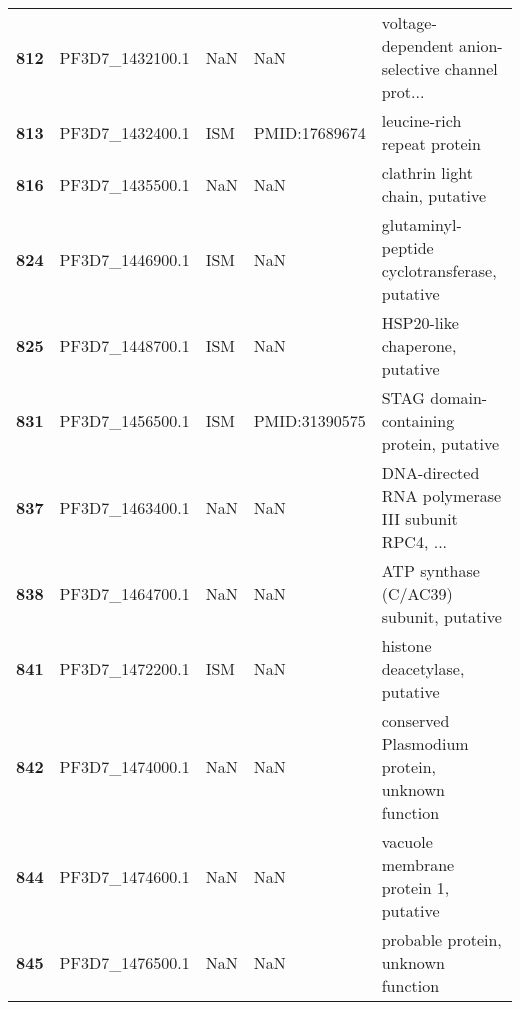 \begin{longtable}{lllll}
\textbf{812} &  PF3D7\_1432100.1 &      NaN &            NaN &  voltage-dependent anion-selective channel prot... \\
\textbf{813} &  PF3D7\_1432400.1 &      ISM &  PMID:17689674 &                        leucine-rich repeat protein \\
\textbf{816} &  PF3D7\_1435500.1 &      NaN &            NaN &                     clathrin light chain, putative \\
\textbf{824} &  PF3D7\_1446900.1 &      ISM &            NaN &      glutaminyl-peptide cyclotransferase, putative \\
\textbf{825} &  PF3D7\_1448700.1 &      ISM &            NaN &                     HSP20-like chaperone, putative \\
\textbf{831} &  PF3D7\_1456500.1 &      ISM &  PMID:31390575 &           STAG domain-containing protein, putative \\
\textbf{837} &  PF3D7\_1463400.1 &      NaN &            NaN &  DNA-directed RNA polymerase III subunit RPC4, ... \\
\textbf{838} &  PF3D7\_1464700.1 &      NaN &            NaN &            ATP synthase (C/AC39) subunit, putative \\
\textbf{841} &  PF3D7\_1472200.1 &      ISM &            NaN &                      histone deacetylase, putative \\
\textbf{842} &  PF3D7\_1474000.1 &      NaN &            NaN &     conserved Plasmodium protein, unknown function \\
\textbf{844} &  PF3D7\_1474600.1 &      NaN &            NaN &               vacuole membrane protein 1, putative \\
\textbf{845} &  PF3D7\_1476500.1 &      NaN &            NaN &                 probable protein, unknown function \\
\end{longtable}
